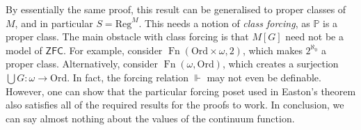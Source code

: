By essentially the same proof, this result can be generalised to proper classes of \( M \), and in particular \( S = \mathrm{Reg}^M \).
This needs a notion of \emph{class forcing}, as \( \mathbb P \) is a proper class.
The main obstacle with class forcing is that \( M[G] \) need not be a model of \( \mathsf{ZFC} \).
For example, consider \( \operatorname{Fn}(\mathrm{Ord} \times \omega, 2) \), which makes \( 2^{\aleph_0} \) a proper class.
Alternatively, consider \( \operatorname{Fn}(\omega, \mathrm{Ord}) \), which creates a surjection \( \bigcup G : \omega \to \mathrm{Ord} \).
In fact, the forcing relation \( \Vdash \) may not even be definable.
However, one can show that the particular forcing poset used in Easton's theorem also satisfies all of the required results for the proofs to work.
In conclusion, we can say almost nothing about the values of the continuum function.
